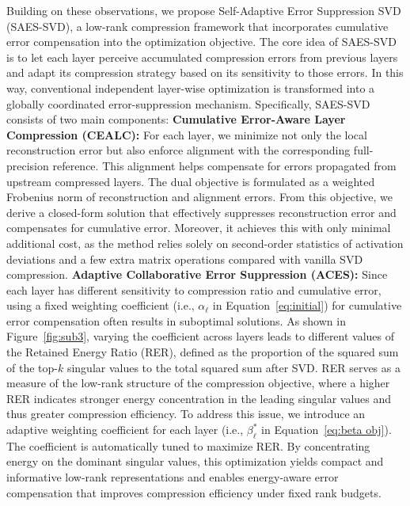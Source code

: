 Building on these observations, we propose Self-Adaptive Error Suppression SVD (SAES-SVD), a low-rank compression framework that incorporates cumulative error compensation into the optimization objective. The core idea of SAES-SVD is to let each layer perceive accumulated compression errors from previous layers and adapt its compression strategy based on its sensitivity to those errors. In this way, conventional independent layer-wise optimization is transformed into a globally coordinated error-suppression mechanism. Specifically, SAES-SVD consists of two main components:
 \textbf{Cumulative Error-Aware Layer Compression (CEALC):} For each layer, we minimize not only the local reconstruction error but also enforce alignment with the corresponding full-precision reference. This alignment helps compensate for errors propagated from upstream compressed layers. The dual objective is formulated as a weighted Frobenius norm of reconstruction and alignment errors. From this objective, we derive a closed-form solution that effectively suppresses reconstruction error and compensates for cumulative error. Moreover, it achieves this with only minimal additional cost, as the method relies solely on second-order statistics of activation deviations and a few extra matrix operations compared with vanilla SVD compression.
 \textbf{Adaptive Collaborative Error Suppression (ACES):} Since each layer has different sensitivity to compression ratio and cumulative error, using a fixed weighting coefficient (i.e., $\alpha_\ell$ in Equation~\ref{eq:initial}) for cumulative error compensation often results in suboptimal solutions. As shown in Figure~\ref{fig:sub3}, varying the coefficient across layers leads to different values of the Retained Energy Ratio (RER), defined as the proportion of the squared sum of the top-$k$ singular values to the total squared sum after SVD. RER serves as a measure of the low-rank structure of the compression objective, where a higher RER indicates stronger energy concentration in the leading singular values and thus greater compression efficiency. To address this issue, we introduce an adaptive weighting coefficient for each layer (i.e., $\beta_\ell^*$ in Equation~\ref{eq:beta obj}). The coefficient is automatically tuned to maximize RER. By concentrating energy on the dominant singular values, this optimization yields compact and informative low-rank representations and enables energy-aware error compensation that improves compression efficiency under fixed rank budgets.

